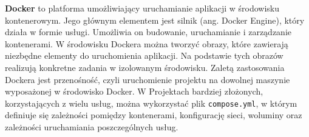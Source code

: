 \textbf{Docker} to platforma umożliwiający uruchamianie aplikacji w środowisku kontenerowym. Jego głównym elementem jest silnik (ang. Docker Engine), który działa w formie usługi. Umożliwia on budowanie, uruchamianie i zarządzanie kontenerami. W środowisku Dockera można tworzyć obrazy, które zawierają niezbędne elementy do uruchomienia aplikacji. Na podstawie tych obrazów realizują konkretne zadania w izolowanym środowisku. Zaletą zastosowania Dockera jest przenośność, czyli uruchomienie projektu na dowolnej maszynie wyposażonej w środowisko Docker. W Projektach bardziej złożonych, korzystających z wielu usług, można wykorzystać plik \texttt{compose.yml}, w którym definiuje się zależności pomiędzy kontenerami, konfigurację sieci, woluminy oraz zależności uruchamiania poszczególnych usług.